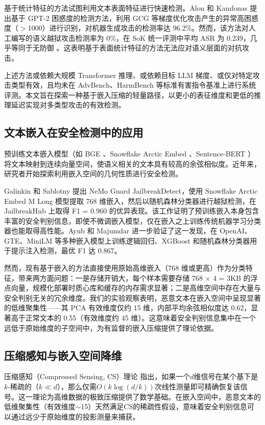 \documentclass[conference]{IEEEtran}
\begin{document}
基于统计特征的方法试图利用文本表面特征进行快速检测。Alon 和 Kamfonas \cite{b9} 提出基于 GPT-2 困惑度的检测方法，利用 GCG 等梯度优化攻击产生的异常高困惑度（$>$1000）进行识别，对机器生成攻击的检测率达 96.2\%。然而，该方法对人工编写的语义越狱攻击检测率为 0\%，在 SoK 统一评测中平均 ASR 为 0.239，几乎等同于无防御 \cite{b8}。这表明基于表面统计特征的方法无法应对语义层面的对抗攻击。

上述方法或依赖大规模 Transformer 推理、或依赖目标 LLM 梯度、或仅对特定攻击类型有效，且均未在 AdvBench、HarmBench 等标准有害指令基准上进行系统评测。本文旨在探索一种基于嵌入压缩的轻量路径，以更小的表征维度和更低的推理延迟实现对多类型攻击的有效检测。

\subsection{文本嵌入在安全检测中的应用}

预训练文本嵌入模型（如 BGE \cite{b10}、Snowflake Arctic Embed \cite{b11}、Sentence-BERT \cite{b12}）将文本映射到连续向量空间，使语义相关的文本具有较高的余弦相似度。近年来，研究者开始探索利用嵌入空间的几何性质进行安全检测。

Galinkin 和 Sablotny \cite{b2} 提出 NeMo Guard JailbreakDetect，使用 Snowflake Arctic Embed M Long 模型提取 768 维嵌入，然后以随机森林分类器进行越狱检测，在 JailbreakHub 上取得 F1 = 0.960 的优异表现。该工作证明了预训练嵌入本身包含丰富的安全判别信息，即使不微调嵌入模型，仅在嵌入之上训练传统机器学习分类器也能取得高性能。Ayub 和 Majumdar \cite{b13} 进一步验证了这一发现，在 OpenAI、GTE、MiniLM 等多种嵌入模型上训练逻辑回归、XGBoost 和随机森林分类器用于提示注入检测，最优 F1 达 0.867。

然而，现有基于嵌入的方法直接使用原始高维嵌入（768 维或更高）作为分类特征，带来两方面问题：一是存储开销大，每个样本需要存储 768 $\times$ 4 = 3KB 的浮点向量，规模化部署时质心库和缓存的内存需求显著；二是高维空间中存在大量与安全判别无关的冗余维度。我们的实验观察表明，恶意文本在嵌入空间中呈现显著的低维聚集性——其 PCA 有效维度仅约 15 维，内部平均余弦相似度达 0.62，显著高于正常文本的 0.55（有效维度约 45 维）。这意味着安全判别信息集中在一个远低于原始维度的子空间中，为有监督的嵌入压缩提供了理论依据。

\subsection{压缩感知与嵌入空间降维}

压缩感知（Compressed Sensing, CS）理论 \cite{b15,b16} 指出，如果一个$d$维信号在某个基下是$k$-稀疏的（$k \ll d$），那么仅需$O(k \log(d/k))$次线性测量即可精确恢复该信号。这一理论为高维数据的极致压缩提供了数学基础。在嵌入空间中，恶意文本的低维聚集性（有效维度$\sim$15）天然满足CS的稀疏性假设，意味着安全判别信息可以通过远少于原始维度的投影测量来捕获。
\end{document}
